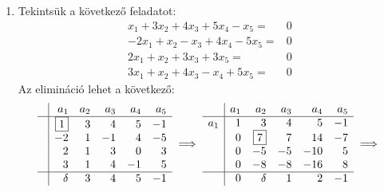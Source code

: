 \documentclass[a4paper, showtrims]{memoir}
\theoremstyle{plain}
\theoremstyle{remark}
\theoremstyle{definition}
\begin{document}
\begin{enumerate}
\[\begin{array}{r|rrr}
      b & 0 & 1 & 0 \\
      c & 0 & 0 & 1
      \end{array}
      \]
      Ez azt jelenti, hogy az eredeti feladat ekvivalens az
      \[x=0,y=0,z=0\]
	  feladattal, amelynek nyilvánvalóan csak a zéró vektor a megoldása.
	\item
	      Tekintsük a következő feladatot:
	      \[
		      \begin{array}{rl}
			      x_1+3x_2+4x_3+5x_4-x_5=  & 0 \\
			      -2x_1+x_2-x_3+4x_4-5x_5= & 0 \\
			      2x_1+x_2+3x_3+3x_5=      & 0 \\
			      3x_1+x_2+4x_3-x_4+5x_5=  & 0
		      \end{array}
	      \]
	      Az elimináció lehet a következő:
	      \begin{multline*}
		      \begin{array}{r|rrrrr}
			       & a_1       & a_2 & a_3 & a_4 & a_5 \\
			      \hline
			       & \boxed{1} & 3   & 4   & 5   & -1  \\
			       & -2        & 1   & -1  & 4   & -5  \\
			       & 2         & 1   & 3   & 0   & 3   \\
			       & 3         & 1   & 4   & -1  & 5   \\
			      \hline
			       & \delta    & 3   & 4   & 5   & -1
		      \end{array}
		      \implies
		      \begin{array}{r|rrrrr}
			          & a_1 & a_2       & a_3 & a_4 & a_5 \\
			      \hline
			      a_1 & 1   & 3         & 4   & 5   & -1  \\
			          & 0   & \boxed{7} & 7   & 14  & -7  \\
			          & 0   & -5        & -5  & -10 & 5   \\
			          & 0   & -8        & -8  & -16 & 8   \\
			      \hline
			          & 0   & \delta    & 1   & 2   & -1
		      \end{array}
		      \implies
		      \\
		      \begin{array}{r|rrrrr}

\end{array}
\end{multline*}
\end{enumerate}
\end{document}
